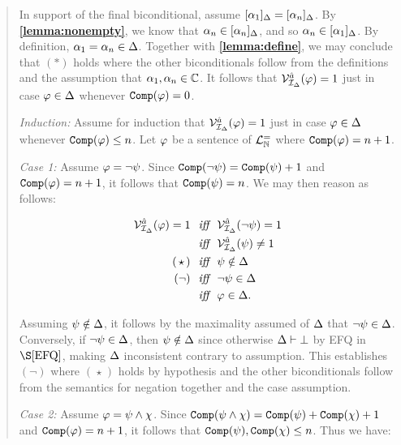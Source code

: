 \begin{quote}
  In support of the final biconditional, assume $[\alpha_1]_{\Delta}=[\alpha_n]_{\Delta}$.
  By \textbf{\ref{lemma:nonempty}}, we know that $\alpha_n\in[\alpha_n]_{\Delta}$, and so $\alpha_n\in[\alpha_1]_{\Delta}$.
  By definition, $\alpha_1=\alpha_n\in\Delta$.
  Together with \textbf{\ref{lemma:define}}, we may conclude that $(\ast)$ holds where the other biconditionals follow from the definitions and the assumption that $\alpha_1,\alpha_n\in\mathbb{C}$.
  It follows that $\mathcal{V}_{\mathcal{I}_{\Delta}}^{\hat{a}}(\varphi)=1$ just in case $\varphi\in\Delta$ whenever $\texttt{Comp}(\varphi)=0$.

  \textit{Induction:}
  Assume for induction that $\mathcal{V}_{\mathcal{I}_{\Delta}}^{\hat{a}}(\varphi)=1$ just in case $\varphi\in\Delta$ whenever $\texttt{Comp}(\varphi)\leq n$. 
  Let $\varphi$ be a sentence of $\mathcal{L}^{=}_{\mathbb{N}}$ where $\texttt{Comp}(\varphi)=n+1$.

  \textit{Case 1:}
  Assume $\varphi=\neg\psi$.
  Since $\texttt{Comp}(\neg\psi)=\texttt{Comp}(\psi)+1$ and $\texttt{Comp}(\varphi)=n+1$, it follows that $\texttt{Comp}(\psi)=n$.
  We may then reason as follows:

  \vspace{-.2in}
  \begin{align*}
    \mathcal{V}_{\mathcal{I}_{\Delta}}^{\hat{a}}(\varphi)=1 &\textit{ ~iff~ } \mathcal{V}_{\mathcal{I}_{\Delta}}^{\hat{a}}(\neg\psi)=1\\
      &\textit{ ~iff~ } \mathcal{V}_{\mathcal{I}_{\Delta}}^{\hat{a}}(\psi)\neq 1 \\
      (\hspace{1.6pt}\star\hspace{1.6pt}) &\textit{ ~iff~ } \psi\notin\Delta \\
      (\neg) &\textit{ ~iff~ } \neg\psi\in\Delta \\
      &\textit{ ~iff~ } \varphi\in\Delta.
  \end{align*}

  Assuming $\psi \notin \Delta$, it follows by the maximality assumed of $\Delta$ that $\neg\psi \in \Delta$. 
  Conversely, if $\neg\psi \in \Delta$, then $\psi \notin \Delta$ since otherwise $\Delta \vdash \bot$ by EFQ in $\S\ref{EFQ}$, making $\Delta$ inconsistent contrary to assumption.
  This establishes $(\neg)$ where $(\hspace{1pt}\star\hspace{1pt})$ holds by hypothesis and the other biconditionals follow from the semantics for negation together and the case assumption.

  \textit{Case 2:}
  Assume $\varphi=\psi\wedge\chi$.
  Since $\texttt{Comp}(\psi\wedge\chi)=\texttt{Comp}(\psi)+\texttt{Comp}(\chi)+1$ and  $\texttt{Comp}(\varphi)=n+1$, it follows that $\texttt{Comp}(\psi), \texttt{Comp}(\chi)\leq n$.
  Thus we have:


\end{quote}
